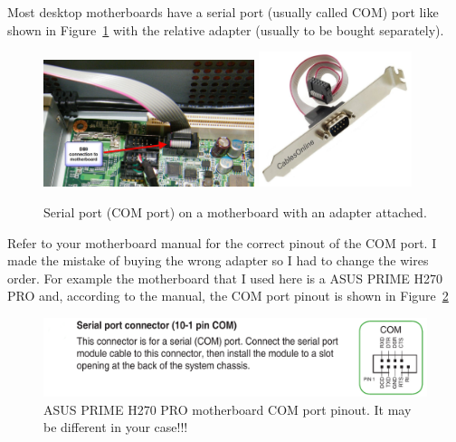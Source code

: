 Most desktop motherboards have a serial port (usually called COM) port like
shown in Figure~\ref{DB9-board-connection} with the relative adapter (usually to
be bought separately).
\begin{figure}[H]
  \centering
  \includegraphics[width=0.55\textwidth,frame]{DB9-board-connection}\hfill
  \includegraphics[width=0.4\textwidth]{RS-232-adapter}
    \caption{Serial port (COM port) on a motherboard with an adapter
    attached.}\label{DB9-board-connection}
\end{figure}

Refer to your motherboard manual for the correct pinout of the COM port. I made
the mistake of buying the wrong adapter so I had to change the wires order. For
example the motherboard that I used here is a ASUS PRIME H270 PRO and, according
to the manual, the COM port pinout is shown in Figure~\ref{RS232-pinout-PC}
\begin{figure}[H]
  \centering \includegraphics[width=\linewidth]{RS232-pinout-PC}
  \caption{ASUS PRIME H270 PRO motherboard COM port pinout. It may be different
    in your case!!!}\label{RS232-pinout-PC}
\end{figure}

